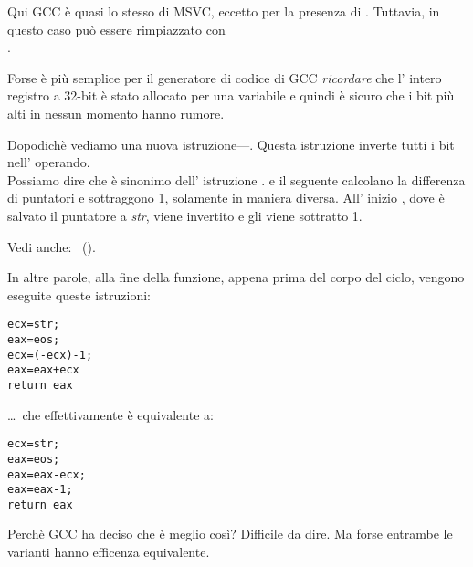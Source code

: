 Qui GCC è quasi lo stesso di MSVC, eccetto per la presenza di \MOVZX.
Tuttavia, in questo caso \MOVZX può essere rimpiazzato con\\
.

Forse è più semplice per il generatore di codice di GCC \emph{ricordare} 
che l' intero registro \EDX a 32-bit 
è stato allocato per una variabile \Tchar e quindi è sicuro che i bit più alti 
in nessun momento hanno rumore.

\label{strlen_NOT_ADD}

Dopodichè vediamo una nuova istruzione---\NOT. Questa istruzione inverte tutti i bit nell' operando. \\
Possiamo dire che è sinonimo dell' istruzione . 
\NOT e il seguente \ADD calcolano la differenza di puntatori e sottraggono 1, solamente in maniera diversa. 
All' inizio \ECX, dove è salvato il puntatore a \emph{str}, viene invertito e gli viene sottratto 1.

Vedi anche: \q{\SignedNumbersSectionName}~().
 
In altre parole, alla fine della funzione, appena prima del corpo del ciclo, vengono eseguite queste istruzioni:

\begin{lstlisting}[style=customc]
ecx=str;
eax=eos;
ecx=(-ecx)-1; 
eax=eax+ecx
return eax
\end{lstlisting}

\dots~che effettivamente è equivalente a:

\begin{lstlisting}[style=customc]
ecx=str;
eax=eos;
eax=eax-ecx;
eax=eax-1;
return eax
\end{lstlisting}

Perchè GCC ha deciso che è meglio così? Difficile da dire.
Ma forse entrambe le varianti hanno efficenza equivalente.
